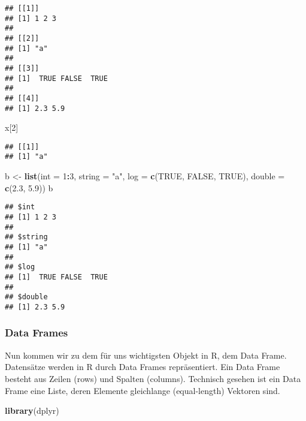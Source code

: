 \documentclass[
]{article}
\newenvironment{Shaded}{\begin{snugshade}}{\end{snugshade}}
\newcommand{\AttributeTok}[1]{\textcolor[rgb]{0.13,0.29,0.53}{#1}}
\newcommand{\ConstantTok}[1]{\textcolor[rgb]{0.56,0.35,0.01}{#1}}
\newcommand{\DecValTok}[1]{\textcolor[rgb]{0.00,0.00,0.81}{#1}}
\newcommand{\FloatTok}[1]{\textcolor[rgb]{0.00,0.00,0.81}{#1}}
\newcommand{\FunctionTok}[1]{\textcolor[rgb]{0.13,0.29,0.53}{\textbf{#1}}}
\newcommand{\NormalTok}[1]{#1}
\newcommand{\OtherTok}[1]{\textcolor[rgb]{0.56,0.35,0.01}{#1}}
\newcommand{\SpecialCharTok}[1]{\textcolor[rgb]{0.81,0.36,0.00}{\textbf{#1}}}
\newcommand{\StringTok}[1]{\textcolor[rgb]{0.31,0.60,0.02}{#1}}
\begin{document}
\begin{verbatim}
## [[1]]
## [1] 1 2 3
## 
## [[2]]
## [1] "a"
## 
## [[3]]
## [1]  TRUE FALSE  TRUE
## 
## [[4]]
## [1] 2.3 5.9
\end{verbatim}

\begin{Shaded}
\begin{Highlighting}[]
\NormalTok{x[}\DecValTok{2}\NormalTok{]}
\end{Highlighting}
\end{Shaded}

\begin{verbatim}
## [[1]]
## [1] "a"
\end{verbatim}

\begin{Shaded}
\begin{Highlighting}[]
\NormalTok{b }\OtherTok{\textless{}{-}} \FunctionTok{list}\NormalTok{(}\AttributeTok{int =} \DecValTok{1}\SpecialCharTok{:}\DecValTok{3}\NormalTok{,}
          \AttributeTok{string =} \StringTok{"a"}\NormalTok{,}
          \AttributeTok{log =} \FunctionTok{c}\NormalTok{(}\ConstantTok{TRUE}\NormalTok{, }\ConstantTok{FALSE}\NormalTok{, }\ConstantTok{TRUE}\NormalTok{),}
          \AttributeTok{double =} \FunctionTok{c}\NormalTok{(}\FloatTok{2.3}\NormalTok{, }\FloatTok{5.9}\NormalTok{))}
\NormalTok{b}
\end{Highlighting}
\end{Shaded}

\begin{verbatim}
## $int
## [1] 1 2 3
## 
## $string
## [1] "a"
## 
## $log
## [1]  TRUE FALSE  TRUE
## 
## $double
## [1] 2.3 5.9
\end{verbatim}

\hypertarget{data-frames}{%
\subsubsection{Data Frames}\label{data-frames}}

Nun kommen wir zu dem für uns wichtigsten Objekt in R, dem Data Frame.
Datensätze werden in R durch Data Frames repräsentiert. Ein Data Frame
besteht aus Zeilen (rows) und Spalten (columns). Technisch gesehen ist
ein Data Frame eine Liste, deren Elemente gleichlange (equal-length)
Vektoren sind.

\begin{Shaded}
\begin{Highlighting}[]
\FunctionTok{library}\NormalTok{(dplyr)}
\end{Highlighting}
\end{Shaded}
\end{document}

